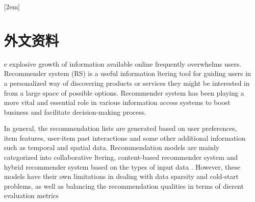
[2em]{\vspace{.5\baselineskip}\xiaosan\song}%
             {\prechaptername\CJKnumber{\thecontentslabel}\postchaptername\qquad}{} %
             {}             %
\chapter*{外文资料}


e explosive growth of information available online frequently overwhelms users. Recommender system (RS) is a useful information ltering tool for guiding users in a personalized way of discovering products or services they might be interested in from a large space of possible options. Recommender system has been playing a more vital and essential role in various information access systems to boost business and facilitate decision-making process.

In general, the recommendation lists are generated based on user preferences, item features, user-item past interactions and some other additional information such as temporal and spatial data. Recommendation models are mainly categorized into collaborative ltering, content-based recommender system and hybrid recommender system based on the types of input data . However, these models have their own limitations in dealing with data sparsity and cold-start problems, as well as balancing the recommendation qualities in terms of dierent evaluation metrics